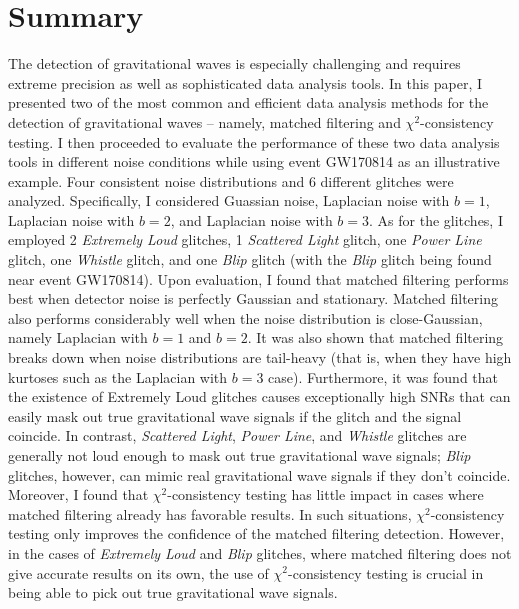 \documentclass[preprint,
letterpaper,
 amsmath,amssymb,
 aps,
]{revtex4-2}
\begin{document}
\section{Summary} \label{summary}
The detection of gravitational waves is especially challenging and requires extreme precision as well as sophisticated data analysis tools. In this paper, I presented two of the most common and efficient data analysis methods for the detection of gravitational waves – namely, matched filtering and $\chi^2$-consistency testing. I then proceeded to evaluate the performance of these two data analysis tools in different noise conditions while using event GW170814 as an illustrative example. Four consistent noise distributions and 6 different glitches were analyzed. Specifically, I considered Guassian noise, Laplacian noise with $b=1$, Laplacian noise with $b=2$, and Laplacian noise with $b=3$. As for the glitches, I employed 2 \textit{Extremely Loud} glitches, 1 \textit{Scattered Light} glitch, one \textit{Power Line} glitch, one \textit{Whistle} glitch, and one \textit{Blip} glitch (with the \textit{Blip} glitch being found near event GW170814). Upon evaluation, I found that matched filtering performs best when detector noise is perfectly Gaussian and stationary. Matched filtering also performs considerably well when the noise distribution is close-Gaussian, namely Laplacian with $b=1$ and $b=2$. It was also shown that matched filtering breaks down when noise distributions are tail-heavy (that is, when they have high kurtoses such as the Laplacian with $b=3$ case). Furthermore, it was found that the existence of Extremely Loud glitches causes exceptionally high SNRs that can easily mask out true gravitational wave signals if the glitch and the signal coincide. In contrast, \textit{Scattered Light}, \textit{Power Line}, and \textit{Whistle} glitches are generally not loud enough to mask out true gravitational wave signals; \textit{Blip} glitches, however, can mimic real gravitational wave signals if they don't coincide. Moreover, I found that $\chi^2$-consistency testing has little impact in cases where matched filtering already has favorable results. In such situations, $\chi^2$-consistency testing only improves the confidence of the matched filtering detection. However, in the cases of \textit{Extremely Loud} and \textit{Blip} glitches, where matched filtering does not give accurate results on its own, the use of $\chi^2$-consistency testing is crucial in being able to pick out true gravitational wave signals. 
\end{document}
